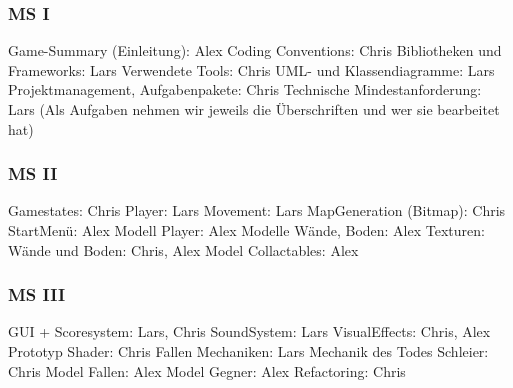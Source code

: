 \documentclass[12pt]{article}
\begin{document}
\vspace{1cm}
\subsubsection{MS I}

Game-Summary (Einleitung): Alex\newline
Coding Conventions: Chris\newline
Bibliotheken und Frameworks: Lars\newline
Verwendete Tools: Chris\newline
UML- und Klassendiagramme: Lars\newline
Projektmanagement, Aufgabenpakete: Chris\newline
Technische Mindestanforderung: Lars\newline
(Als Aufgaben nehmen wir jeweils die Überschriften und wer sie bearbeitet hat)\newline
\newline

\vspace{1cm}
\subsubsection{MS II}

Gamestates: Chris\newline
Player: Lars\newline
Movement: Lars
MapGeneration (Bitmap): Chris\newline
StartMenü: Alex\newline
Modell Player: Alex\newline
Modelle Wände, Boden: Alex\newline
Texturen: Wände und Boden: Chris, Alex\newline
Model Collactables: Alex\newline
\newline

\vspace{1cm}
\subsubsection{MS III}

GUI + Scoresystem: Lars, Chris\newline
SoundSystem: Lars\newline
VisualEffects: Chris, Alex\newline
Prototyp Shader: Chris\newline
Fallen Mechaniken: Lars\newline
Mechanik des Todes Schleier: Chris\newline
Model Fallen: Alex\newline
Model Gegner: Alex\newline
Refactoring: Chris\newline
\end{document}
